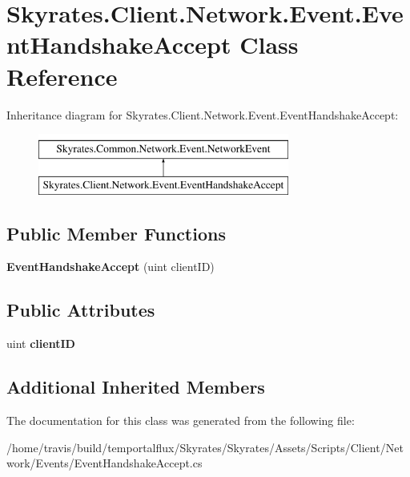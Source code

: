 \hypertarget{class_skyrates_1_1_client_1_1_network_1_1_event_1_1_event_handshake_accept}{\section{Skyrates.\-Client.\-Network.\-Event.\-Event\-Handshake\-Accept Class Reference}
\label{class_skyrates_1_1_client_1_1_network_1_1_event_1_1_event_handshake_accept}
}
Inheritance diagram for Skyrates.\-Client.\-Network.\-Event.\-Event\-Handshake\-Accept\-:\begin{figure}[H]
\begin{center}
\leavevmode
\includegraphics[height=2.000000cm]{class_skyrates_1_1_client_1_1_network_1_1_event_1_1_event_handshake_accept}
\end{center}
\end{figure}
\subsection*{Public Member Functions}
\begin{DoxyCompactItemize}
\item 
\hypertarget{class_skyrates_1_1_client_1_1_network_1_1_event_1_1_event_handshake_accept_a14a69b69b72035304b14b43304ae5299}{{\bfseries Event\-Handshake\-Accept} (uint client\-I\-D)}\label{class_skyrates_1_1_client_1_1_network_1_1_event_1_1_event_handshake_accept_a14a69b69b72035304b14b43304ae5299}

\end{DoxyCompactItemize}
\subsection*{Public Attributes}
\begin{DoxyCompactItemize}
\item 
\hypertarget{class_skyrates_1_1_client_1_1_network_1_1_event_1_1_event_handshake_accept_a39fb719be23a5f59db20260f88835f44}{uint {\bfseries client\-I\-D}}\label{class_skyrates_1_1_client_1_1_network_1_1_event_1_1_event_handshake_accept_a39fb719be23a5f59db20260f88835f44}

\end{DoxyCompactItemize}
\subsection*{Additional Inherited Members}


The documentation for this class was generated from the following file\-:\begin{DoxyCompactItemize}
\item 
/home/travis/build/temportalflux/\-Skyrates/\-Skyrates/\-Assets/\-Scripts/\-Client/\-Network/\-Events/Event\-Handshake\-Accept.\-cs\end{DoxyCompactItemize}

